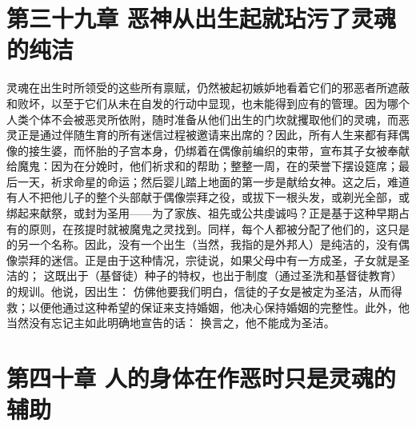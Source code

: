 
\section{第三十九章 恶神从出生起就玷污了灵魂的纯洁}

灵魂在出生时所领受的这些所有禀赋，仍然被起初嫉妒地看着它们的邪恶者所遮蔽和败坏，以至于它们从未在自发的行动中显现，也未能得到应有的管理。因为哪个人类个体不会被恶灵所依附，随时准备从他们出生的门坎就攫取他们的灵魂，而恶灵正是通过伴随生育的所有迷信过程被邀请来出席的？因此，所有人生来都有拜偶像的接生婆，而怀胎的子宫本身，仍绑着在偶像前编织的束带，宣布其子女被奉献给魔鬼：因为在分娩时，他们祈求和的帮助；整整一周，在的荣誉下摆设筵席；最后一天，祈求命星的命运；然后婴儿踏上地面的第一步是献给女神。这之后，难道有人不把他儿子的整个头部献于偶像崇拜之役，或拔下一根头发，或剃光全部，或绑起来献祭，或封为圣用——为了家族、祖先或公共虔诚吗？正是基于这种早期占有的原则，在孩提时就被魔鬼之灵找到。同样，每个人都被分配了他们的，这只是的另一个名称。因此，没有一个出生（当然，我指的是外邦人）是纯洁的，没有偶像崇拜的迷信。正是由于这种情况，宗徒说，如果父母中有一方成圣，子女就是圣洁的； 这既出于（基督徒）种子的特权，也出于制度（通过圣洗和基督徒教育）的规训。他说，因出生： 仿佛他要我们明白，信徒的子女是被定为圣洁，从而得救；以便他通过这种希望的保证来支持婚姻，他决心保持婚姻的完整性。此外，他当然没有忘记主如此明确地宣告的话： 换言之，他不能成为圣洁。\par


\section{第四十章 人的身体在作恶时只是灵魂的辅助}

